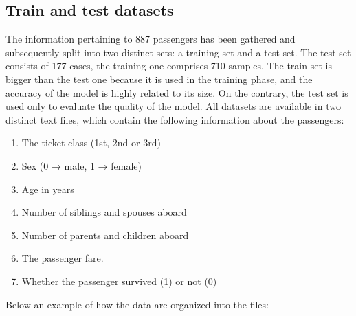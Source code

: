 \documentclass{article}
\begin{document}
\subsection{Train and test datasets}
The information pertaining to 887 passengers has been gathered and subsequently split into two distinct sets: a training set and a test set.
The test set consists of 177 cases, the training one comprises 710 samples.
The train set is bigger than the test one because it is used in the training phase, and the accuracy of the model is highly related to its size.
On the contrary, the test set is used only to evaluate the quality of the model.
All datasets are available in two distinct text files, which contain the following information about the passengers:

\begin{enumerate}
  \item The ticket class (1st, 2nd or 3rd)
  \item Sex (0 → male, 1 → female)
  \item Age in years
  \item Number of siblings and spouses aboard
  \item Number of parents and children aboard
  \item The passenger fare.
  \item Whether the passenger survived (1) or not (0)
\end{enumerate}

\noindent
Below an example of how the data are organized into the files:
\bgroup
{}
\end{document}
